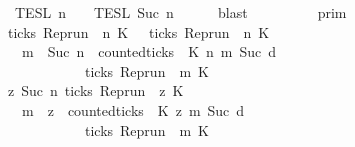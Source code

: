 \begin{isabellebody}
\ \ \ \ \ \ \ \ \ \ \ \ \ \ \ \ {\isasyminter}\ {\isasymlbrakk}{\isasymlbrakk}\ {\isasymPsi}\ {\isasymrbrakk}{\isasymrbrakk}\isactrlsub T\isactrlsub E\isactrlsub S\isactrlsub L\isactrlbsup {\isasymge}\ n\isactrlesup \ {\isasyminter}\ {\isasymlbrakk}{\isasymlbrakk}\ {\isasymPhi}\ {\isasymrbrakk}{\isasymrbrakk}\isactrlsub T\isactrlsub E\isactrlsub S\isactrlsub L\isactrlbsup {\isasymge}\ Suc\ n\isactrlesup {\isacartoucheclose}\isanewline
\ \ \ \ \isamarkupfalse%
\ blast\isanewline
\ \ \isamarkupfalse%
\ \isamarkupfalse%
\ {\isacartoucheopen}{\isachardot}{\isachardot}{\isachardot}\ {\isacharequal}\ {\isasymlbrakk}{\isasymlbrakk}\ {\isasymGamma}\ {\isasymrbrakk}{\isasymrbrakk}\isactrlsub p\isactrlsub r\isactrlsub i\isactrlsub m\ \isanewline
\ \ \ \ \ \ \ \ \ \ \ \ \ \ \ \ {\isasyminter}\ {\isacharparenleft}{\isacharbraceleft}{\isasymrho}{\isachardot}\ {\isasymnot}ticks\ {\isacharparenleft}{\isacharparenleft}Rep{\isacharunderscore}run\ {\isasymrho}{\isacharparenright}\ n\ K\ {\isasymunion}\ {\isacharbraceleft}{\isasymrho}{\isachardot}\ ticks\ {\isacharparenleft}{\isacharparenleft}Rep{\isacharunderscore}run\ {\isasymrho}{\isacharparenright}\ n\ K\ {\isasymand}\isanewline
\ \ \ \ \ \ \ \ \ \ \ \ \ \ \ \ \ \ \ \ {\isacharparenleft}{\isasymforall}m\ {\isasymge}\ Suc\ n{\isachardot}\ \ counted{\isacharunderscore}ticks\ {\isasymrho}\ K\ n\ m\ {\isacharparenleft}Suc\ d{\isacharparenright}\isanewline
\ \ \ \ \ \ \ \ \ \ \ \ \ \ \ \ \ \ \ \ \ \ \ \ \ \ \ \ {\isasymlongrightarrow}\ ticks\ {\isacharparenleft}{\isacharparenleft}Rep{\isacharunderscore}run\ {\isasymrho}{\isacharparenright}\ m\ K\ {\isacharbraceright}{\isacharparenright}\isanewline
\ \ \ \ \ \ \ \ \ \ \ \ \ \ \ \ {\isasyminter}\ {\isacharbraceleft}{\isasymrho}{\isachardot}\ {\isasymforall}z{\isasymge}\ Suc\ n{\isachardot}\ ticks\ {\isacharparenleft}{\isacharparenleft}Rep{\isacharunderscore}run\ {\isasymrho}{\isacharparenright}\ z\ K\ {\isasymlongrightarrow}\isanewline
\ \ \ \ \ \ \ \ \ \ \ \ \ \ \ \ \ \ \ \ {\isacharparenleft}{\isasymforall}m\ {\isasymge}\ z{\isachardot}\ \ counted{\isacharunderscore}ticks\ {\isasymrho}\ K\ z\ m\ {\isacharparenleft}Suc\ d{\isacharparenright}\isanewline
\ \ \ \ \ \ \ \ \ \ \ \ \ \ \ \ \ \ \ \ \ \ \ \ \ \ \ \ {\isasymlongrightarrow}\ ticks\ {\isacharparenleft}{\isacharparenleft}Rep{\isacharunderscore}run\ {\isasymrho}{\isacharparenright}\ m\ K\ {\isacharbraceright}\isanewline

\end{isabellebody}
